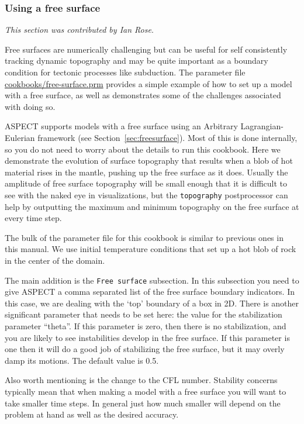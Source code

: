 \documentclass{article}
\newcommand{\aspect}{\textsc{ASPECT}}
\begin{document}
\subsubsection{Using a free surface}
\label{sec:cookbooks-freesurface}
\textit{This section was contributed by Ian Rose}.

Free surfaces are numerically challenging but can be useful for self consistently
tracking dynamic topography and may be quite important as a boundary condition
for tectonic processes like subduction.  The parameter file \url{cookbooks/free-surface.prm} 
provides a simple example of how to set up a model with a free surface, as well 
as demonstrates some of the challenges associated with doing so.

\aspect{} supports models with a free surface using an Arbitrary Lagrangian-Eulerian 
framework (see Section~\ref{sec:freesurface}).  Most of this is done internally, so you do not need to worry about the
details to run this cookbook.  Here we demonstrate the evolution of surface topography 
that results when a blob of hot material rises in the mantle, pushing up the free
surface as it does.  Usually the amplitude of free surface topography 
will be small enough that it is difficult to see with the naked eye in visualizations,
but the \texttt{topography} postprocessor can help by outputting the maximum and minimum 
topography on the free surface at every time step. 

The bulk of the parameter file for this cookbook is similar to previous ones in this manual.
We use initial temperature conditions that set up a hot blob of rock in the center of the 
domain.

The main addition is the \texttt{Free surface} subsection.
In this subsection you need to give \aspect{} a comma
separated list of the free surface boundary indicators.  In this case, we are
dealing with the `top' boundary of a box in 2D.
There is another significant
parameter that needs to be set here: the value for the stabilization parameter ``theta''.
If this parameter is zero, then there is no stabilization, and you are likely to
see instabilities develop in the free surface.  If this parameter is one then it
will do a good job of stabilizing the free surface, but it may overly damp its 
motions.  The default value is 0.5.

Also worth mentioning is the change to the CFL number. Stability concerns typically 
mean that when making a model with a free surface you will want to take smaller 
time steps.  In general just how much smaller will depend on the problem at hand
as well as the desired accuracy.  
\end{document}

